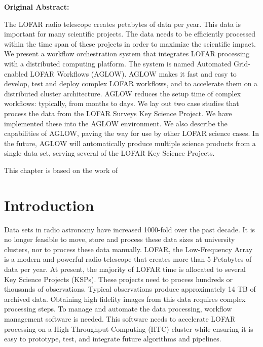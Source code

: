 \begin{tcolorbox}[colback=thesislight,colframe=thesismid,width=\dimexpr\textwidth+12mm\relax]

    \textbf{Original Abstract:}

The LOFAR radio telescope creates petabytes of data per year. This data is important for many scientific projects. The data needs to be efficiently processed within the time span of these projects in order to maximize the scientific impact. We present a workflow orchestration system that integrates LOFAR processing with a distributed computing platform. The system is named Automated Grid-enabled LOFAR Workflows (AGLOW). AGLOW makes it fast and easy to develop, test and deploy complex LOFAR workflows, and to accelerate them on a distributed cluster architecture. AGLOW reduces the setup time of complex workflows: typically, from months to days. We lay out two case studies that process the data from the LOFAR Surveys Key Science Project. We have implemented these into the AGLOW environment. We also describe the capabilities of AGLOW, paving the way for use by other LOFAR science cases. In the future, AGLOW will automatically produce multiple science products from a single data set, serving several of the LOFAR Key Science Projects.

     This chapter is based on the work of  
\end{tcolorbox}


%
%
\section{Introduction}\label{sec:ch5_intro}

Data sets in radio astronomy have increased 1000-fold over the past decade\cite{sabater_datasize}. It is no longer feasible to move, store and process these data sizes at university clusters, nor to process these data manually. LOFAR, the Low-Frequency Array\cite{LOFAR} is a modern and powerful radio telescope that creates more than 5 Petabytes of data per year. At present, the majority of LOFAR time is allocated to several Key Science Projects (KSPs)\cite{lotss}. These projects need to process hundreds or thousands of observations. Typical observations produce approximately 14 TB of archived data. Obtaining high fidelity images from this data requires complex processing steps. To manage and automate the data processing, workflow management software is needed. This software needs to accelerate LOFAR processing on a High Throughput Computing (HTC) cluster while ensuring it is easy to prototype, test, and integrate future algorithms and pipelines. 
	
